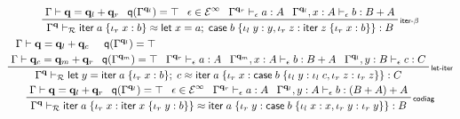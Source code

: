 \documentclass[acmsmall,screen,review]{acmart}
\newcommand{\mc}[1]{\ensuremath{\mathcal{#1}}}
\newcommand{\mb}[1]{\ensuremath{\mathbf{#1}}}
\newcommand{\ms}[1]{\ensuremath{\mathsf{#1}}}
\newcommand{\lto}{:}
\newcommand{\linl}[1]{\iota_l\;{#1}}
\newcommand{\linr}[1]{\iota_r\;{#1}}
\newcommand{\letexpr}[3]{\ensuremath{\ms{let}\;#1 = #2;\;#3}}
\newcommand{\caseexpr}[5]{\ms{case}\;#1\;\{\linl{#2} \lto #3, \linr{#4} \lto #5\}}
\newcommand{\liter}[3]{\ms{iter}\;#1\;\{ \linr{#2} \lto #3 \}}
\newcommand{\einf}[1]{#1 \in \mc{E}^\infty}
\newcommand{\qsp}[4]{#1 \vdash #2 = #3 + #4}
\newcommand{\rle}[1]{{\scriptsize\textsf{#1}}}
\newcommand{\hasty}[4]{#1 \vdash_{#2} #3: {#4}}
\newcommand{\teqv}{\approx}
\newcommand{\tmeq}[5]{#1 \vdash_{#2} #3 \teqv #4 : {#5}}
\newcommand{\alquant}{\ms{q}}
\begin{document}
\begin{figure}
  \begin{adjustbox}{minipage=1.1\textwidth,scale=0.9}
  \begin{gather*}
    \prftree[r]{\rle{iter-$\beta$}}
      {\qsp{\Gamma}{\mb{q}}{\mb{q}_l}{\mb{q}_r}}
      {\alquant(\Gamma^{\mb{q}_l}) = \top}
      {\einf{\epsilon}}
      {\hasty{\Gamma^{\mb{q}_r}}{\epsilon}{a}{A}}
      {\hasty{\Gamma^{\mb{q}_l}, x : A}{\epsilon}{b}{B + A}}
      {\tmeq
        {\Gamma^{\mb{q}}}{\mc{R}}{\liter{a}{x}{b}}
        {\letexpr{x}{a}{\caseexpr{b}{y}{y}{z}{\liter{z}{x}{b}}}}{B}}
    \\
    \prftree[r]{\rle{let-iter}}
      {
      \prfStackPremises
      {\qsp{\Gamma}{\mb{q}}{\mb{q}_l}{\mb{q}_c}}
      {\qsp{\Gamma}{\mb{q}_c}{\mb{q}_m}{\mb{q}_r}}
      }
      {
      \prfStackPremises
      {\alquant(\Gamma^{\mb{q}_l}) = \top}
      {\alquant(\Gamma^{\mb{q}_m}) = \top}
      }
      {\hasty{\Gamma^{\mb{q}_r}}{\epsilon}{a}{A}}
      {\hasty{\Gamma^{\mb{q}_m}, x : A}{\epsilon}{b}{B + A}}
      {\hasty{\Gamma^{\mb{q}_l}, y : B}{\epsilon}{c}{C}}
      {\tmeq{\Gamma^{\mb{q}}}{\mc{R}}
        {\letexpr{y}{\liter{a}{x}{b}}{c}}
        {\liter{a}{x}{\caseexpr{b}{y}{\linl{c}}{z}{\linr{z}}}}
        {C}
      } \\
    \prftree[r]{\rle{codiag}}
      {\qsp{\Gamma}{\mb{q}}{\mb{q}_l}{\mb{q}_r}}
      {\alquant(\Gamma^{\mb{q}_l}) = \top}
      {\einf{\epsilon}}
      {\hasty{\Gamma^{\mb{q}_r}}{\epsilon}{a}{A}}
      {\hasty{\Gamma^{\mb{q}_l}, y : A}{\epsilon}{b}{(B + A) + A}}
      {\tmeq
        {\Gamma^{\mb{q}}}{\mc{R}}{\liter{a}{x}{\liter{x}{y}{b}}}
        {\liter{a}{y}{\caseexpr{b}{x}{x}{y}{\linr{y}}}}{B}} \\
  \end{gather*}

\end{adjustbox}
\end{figure}
\end{document}
